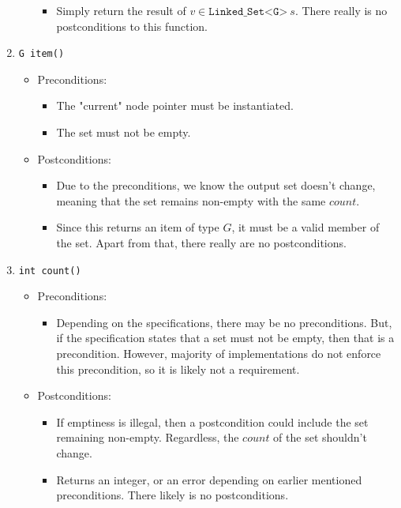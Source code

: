 \documentclass{article}
\newcommand{\LSet}{\texttt{Linked\_Set<G>}\ }
\begin{document}
\begin{enumerate}
\begin{itemize}
\begin{itemize}
            \item Simply return the result of $v \in \LSet s$. There really is no postconditions to this function.
        \end{itemize}
    \end{itemize}
    \item \texttt{G item()}
    \begin{itemize}
        \item Preconditions:
        \begin{itemize}
            \item The "current" node pointer must be instantiated.
            \item The set must not be empty.
        \end{itemize}
        \item Postconditions:
        \begin{itemize}
            \item Due to the preconditions, we know the output set doesn't change, meaning that the set remains non-empty with the same $count$.
            \item Since this returns an item of type $G$, it must be a valid member of the set. Apart from that, there really are no postconditions.
        \end{itemize}
    \end{itemize}
    \item \texttt{int count()}
    \begin{itemize}
        \item Preconditions:
        \begin{itemize}
            \item Depending on the specifications, there may be no preconditions. But, if the specification states that a set must not be empty, then that is a precondition. However, majority of implementations do not enforce this precondition, so it is likely not a requirement.
        \end{itemize}
        \item Postconditions:
        \begin{itemize}
            \item If emptiness is illegal, then a postcondition could include the set remaining non-empty. Regardless, the $count$ of the set shouldn't change.
            \item Returns an integer, or an error depending on earlier mentioned preconditions. There likely is no postconditions.
        \end{itemize}

\end{itemize}
\end{enumerate}
\end{document}
